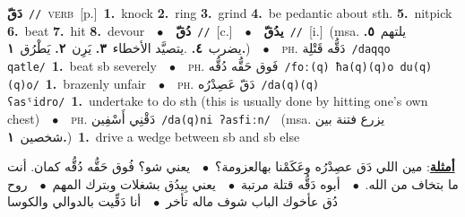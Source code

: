 \documentclass[10pt,a4paper,twoside]{article} %
\begin{document}
\begin{multicols}{2}
{\setlength\topsep{0pt}\textbf{\foreignlanguage{arabic}{دَقّ}}\ {\color{gray}\texttt{//}\color{black}}\ \textsc{verb}\ [p.]\ \textbf{1.}~knock  \textbf{2.}~ring  \textbf{3.}~grind  \textbf{4.}~be pedantic about sth.  \textbf{5.}~nitpick  \textbf{6.}~beat  \textbf{7.}~hit  \textbf{8.}~devour\ \ $\bullet$\ \ \setlength\topsep{0pt}\textbf{\foreignlanguage{arabic}{دُقّ}}\ {\color{gray}\texttt{//}\color{black}}\ [c.]\ \ $\bullet$\ \ \setlength\topsep{0pt}\textbf{\foreignlanguage{arabic}{يدُقّ}}\ {\color{gray}\texttt{//}\color{black}}\ [i.]\ \color{gray}(msa. \foreignlanguage{arabic}{يلتهم}~\foreignlanguage{arabic}{\textbf{٥.}}  \foreignlanguage{arabic}{يضرب}~\foreignlanguage{arabic}{\textbf{٤.}}  .\foreignlanguage{arabic}{يتصيَّد الأخطاء}~\foreignlanguage{arabic}{\textbf{٣.}}  \foreignlanguage{arabic}{يَرِن}~\foreignlanguage{arabic}{\textbf{٢.}}  \foreignlanguage{arabic}{يَطْرُق}~\foreignlanguage{arabic}{\textbf{١.}})\color{black}\ \ $\bullet$\ \ \textsc{ph.} \color{gray} \foreignlanguage{arabic}{دَقُّه قَتْلِة}\color{black}\ {\color{gray}\texttt{/{\sffamily daqqo qatle}/}\color{black}}\ \textbf{1.}~beat sb severely\ \ $\bullet$\ \ \textsc{ph.} \color{gray} \foreignlanguage{arabic}{فَوق حَقُّه دُقُّه}\color{black}\ {\color{gray}\texttt{/{\sffamily foː(q) ħa(q)(q)o du(q)(q)o}/}\color{black}}\ \textbf{1.}~brazenly unfair\ \ $\bullet$\ \ \textsc{ph.} \color{gray} \foreignlanguage{arabic}{دَقّ عَصِدْرُه}\color{black}\ {\color{gray}\texttt{/{\sffamily da(q)(q) ʕasˤidro}/}\color{black}}\ \textbf{1.}~undertake to do sth (this is usually done by hitting one's own chest)\ \ $\bullet$\ \ \textsc{ph.} \color{gray} \foreignlanguage{arabic}{دَقْنِي أَسْفِين}\color{black}\ {\color{gray}\texttt{/{\sffamily da(q)ni ʔasfiːn}/}\color{black}}\ \color{gray} (msa. \foreignlanguage{arabic}{يزرع فتنة بين شخصين}~\foreignlanguage{arabic}{\textbf{١.}})\color{black}\ \textbf{1.}~drive a wedge between sb and sb else\  \begin{flushright}\color{gray}\foreignlanguage{arabic}{\textbf{\underline{\foreignlanguage{arabic}{أمثلة}}}: مين اللي دَق عصِدْرُه وعَكَمْنا بهالعزومة؟\ $\bullet$\ \  يعني شو؟ فُوق حَقُّه دُقُّه كمان. أنت ما بتخاف من الله.\ $\bullet$\ \  أبوه دَقُّه قتلة مرتبة\ $\bullet$\ \  يعني بِيدُق بشغلات وبترك المهم\ $\bullet$\ \  روح دُق عأخوك الباب شوف ماله تأخر\ $\bullet$\ \  أنا دَقِّيت بالدوالي والكوسا}\end{flushright}\color{black}} \vspace{2mm}


\end{multicols}
\end{document}
